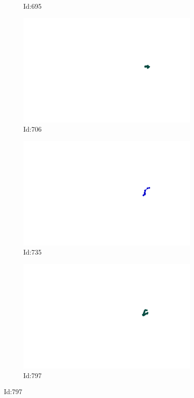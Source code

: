 \documentclass[12pt,twoside]{report}
\begin{document}
\begin{figure}
\begin{subfigure}[b]{0.20\textwidth}
\caption{Id:695}
\end{subfigure}
\begin{subfigure}[b]{0.20\textwidth}
\centering
\includegraphics[width=\textwidth]{../../trajectories/706.png}
\caption{Id:706}
\end{subfigure}
\begin{subfigure}[b]{0.20\textwidth}
\centering
\includegraphics[width=\textwidth]{../../trajectories/735.png}
\caption{Id:735}
\end{subfigure}
\begin{subfigure}[b]{0.20\textwidth}
\centering
\includegraphics[width=\textwidth]{../../trajectories/797.png}
\caption{Id:797}
\end{subfigure}
\end{figure}
\end{document}
